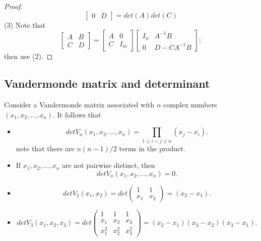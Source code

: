 \begin{refsection}
\begin{proof}
$$\begin{bmatrix}
	0& D
	\end{bmatrix} = det(A)det(C) $$	
	(3) Note that
	$$\begin{bmatrix}
	A& B\\
	C& D
	\end{bmatrix} = \begin{bmatrix}
	A& 0\\
	C& I_m
	\end{bmatrix} \begin{bmatrix}
	I_n& A^{-1}B\\
	0& D-CA^{-1}B
	\end{bmatrix};$$
	then use (2).
\end{proof}

\subsection{Vandermonde matrix and determinant}


\begin{lemma}\label{ch:linearalgebra:th:determinantOfVandermondeMatrix}
Consider a Vandermonde matrix associated with $n$ complex numbers $(x_1,x_2,...,x_n)$.
It follows that
\begin{itemize}
	\item 
	$$det V_n(x_1,x_2,...,x_n) = \prod_{1\leq i< j\leq n} (x_j-x_i).$$
	note that there are $n(n-1)/2$ terms in the product.
	\item 
	If $x_1,x_2,...,x_n$ are not pairwise distinct, then
	$$det V_n(x_1,x_2,...,x_n) = 0.$$
\end{itemize}
\end{lemma}

\begin{example}\hfill
\begin{itemize}
	\item 
	$$det V_2(x_1,x_2) = det \begin{pmatrix}
	1 & 1\\
	x_1 & x_2
	\end{pmatrix} = (x_2-x_1).$$
	\item 
	$$det V_3(x_1,x_2,x_3) = det \begin{pmatrix}
	1 & 1 & 1\\
	x_1 & x_2 & x_3\\
	x_1^2 & x_2^2 & x_3^2
	\end{pmatrix} = (x_2-x_1)(x_3-x_2)(x_3-x_1).$$
\end{itemize}	
\end{example}



\end{refsection}

